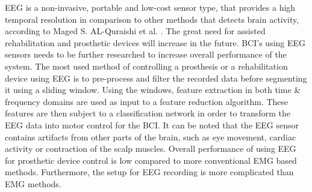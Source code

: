 \documentclass[../main.tex]{subfiles}
\begin{document}
\gls{EEG} is a non-invasive, portable and low-cost sensor type, that provides a high temporal resolution in comparison to other methods that detects brain activity, according to Maged S. AL-Quraishi et al. \cite{quraishi2018}.
The great need for assisted rehabilitation and prosthetic devices will increase in the future.
\gls{BCI}'s using \gls{EEG} sensors needs to be further researched to increase overall performance of the system.
The most used method of controlling a prosthesis or a rehabilitation device using \gls{EEG} is to pre-process and filter the recorded data before segmenting it using a sliding window.
Using the windows, feature extraction in both time \& frequency domains are used as input to a feature reduction algorithm.
These features are then subject to a classification network in order to transform the \gls{EEG} data into motor control for the \gls{BCI}.
It can be noted that the EEG sensor contains artifacts from other parts of the brain, such as eye movement, cardiac activity or contraction of the scalp muscles. 
Overall performance of using \gls{EEG} for prosthetic device control is low compared to more conventional \gls{EMG} based methods.
Furthermore, the setup for EEG recording is more complicated than \gls{EMG} methods.



\end{document}
